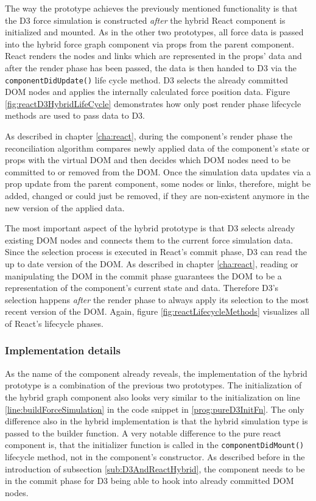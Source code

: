 The way the prototype achieves the previously mentioned functionality is that the D3 force simulation is constructed \emph{after} the hybrid React component is initialized and mounted. As in the other two prototypes, all force data is passed into the hybrid force graph component via props from the parent component. React renders the nodes and links which are represented in the props' data and after the render phase has been passed, the data is then handed to D3 via the \texttt{componentDidUpdate()} life cycle method. D3 selects the already committed DOM nodes and applies the internally calculated force position data. Figure \ref{fig:reactD3HybridLifeCycle} demonstrates how only post render phase lifecycle methods are used to pass data to D3.

As described in chapter \ref{cha:react}, during the component's render phase the reconciliation algorithm compares newly applied data of the component's state or props with the virtual DOM and then decides which DOM nodes need to be committed to or removed from the DOM. Once the simulation data updates via a prop update from the parent component, some nodes or links, therefore, might be added, changed or could just be removed, if they are non-existent anymore in the new version of the applied data.

The most important aspect of the hybrid prototype is that D3 selects already existing DOM nodes and connects them to the current force simulation data. Since the selection process is executed in React's commit phase, D3 can read the up to date version of the DOM. As described in chapter \ref{cha:react}, reading or manipulating the DOM in the commit phase guarantees the DOM to be a representation of the component's current state and data. Therefore D3's selection happens \emph{after} the render phase to always apply its selection to the most recent version of the DOM. Again, figure \ref{fig:reactLifecycleMethods} visualizes all of React's lifecycle phases.

\subsubsection{Implementation details}

As the name of the component already reveals, the implementation of the hybrid prototype is a combination of the previous two prototypes. The initialization of the hybrid graph component also looks very similar to the initialization on line \ref{line:buildForceSimulation} in the code snippet in \ref{prog:pureD3InitFn}. The only difference also in the hybrid implementation is that the hybrid simulation type is passed to the builder function. A very notable difference to the pure react component is, that the initializer function is called in the \texttt{componentDidMount()} lifecycle method, not in the component's constructor. As described before in the introduction of subsection \ref{sub:D3AndReactHybrid}, the component needs to be in the commit phase for D3 being able to hook into already committed DOM nodes.

